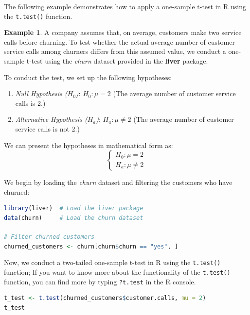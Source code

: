 \documentclass[
  11pt,
]{book}
\newcommand{\passthrough}[1]{#1}
\providecommand{\tightlist}{%
  \setlength{\itemsep}{0pt}\setlength{\parskip}{0pt}}
\theoremstyle{definition}
\theoremstyle{definition}
\newtheorem{example}{Example}[chapter]
\theoremstyle{definition}
\theoremstyle{definition}
\theoremstyle{remark}
\begin{document}
The following example demonstrates how to apply a one-sample t-test in R using the \passthrough{\lstinline!t.test()!} function.

\begin{example}
\protect\hypertarget{exm:ex-one-sample-test}{}\label{exm:ex-one-sample-test}A company assumes that, on average, customers make two service calls before churning. To test whether the actual average number of customer service calls among churners differs from this assumed value, we conduct a one-sample t-test using the \emph{churn} dataset provided in the \textbf{liver} package.

To conduct the test, we set up the following hypotheses:

\begin{enumerate}
\def\labelenumi{\arabic{enumi}.}
\tightlist
\item
  \emph{Null Hypothesis (\(H_0\))}: \(H_0: \mu = 2\) (The average number of customer service calls is 2.)\\
\item
  \emph{Alternative Hypothesis (\(H_a\))}: \(H_a: \mu \neq 2\) (The average number of customer service calls is not 2.)
\end{enumerate}

We can present the hypotheses in mathematical form as:
\[
\begin{cases}
    H_0: \mu = 2   \\
    H_a: \mu \neq 2  
\end{cases}
\]

We begin by loading the \emph{churn} dataset and filtering the customers who have churned:

\begin{lstlisting}[language=R]
library(liver)  # Load the liver package
data(churn)     # Load the churn dataset

# Filter churned customers
churned_customers <- churn[churn$churn == "yes", ]
\end{lstlisting}

Now, we conduct a two-tailed one-sample t-test in R using the \passthrough{\lstinline!t.test()!} function; If you want to know more about the functionality of the \passthrough{\lstinline!t.test()!} function, you can find more by typing \passthrough{\lstinline!?t.test!} in the R console.

\begin{lstlisting}[language=R]
t_test <- t.test(churned_customers$customer.calls, mu = 2)
t_test
   

\end{lstlisting}
\end{example}
\end{document}
